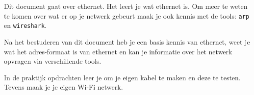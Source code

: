 Dit document gaat over ethernet. Het leert je wat ethernet is. Om meer te weten te komen over wat er op je netwerk gebeurt maak je ook kennis met de tools: \texttt{arp} en \texttt{wireshark}.

Na het bestuderen van dit document heb je een basis kennis van ethernet, weet je wat het adres-formaat is van ethernet en kan je informatie over het netwerk opvragen via verschillende tools.

In de praktijk opdrachten leer je om je eigen kabel te maken en deze te testen. Tevens maak je je eigen Wi-Fi netwerk.
